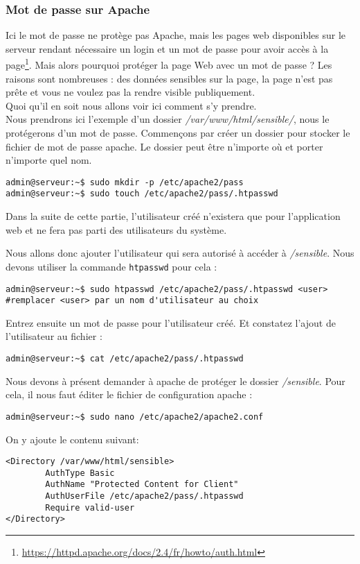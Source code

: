 \subsubsection{Mot de passe sur Apache}\label{MDP}
Ici le mot de passe ne protège pas Apache, mais les pages web disponibles sur le serveur rendant nécessaire un login et un mot de passe pour avoir accès à la page\footnote{\url{https://httpd.apache.org/docs/2.4/fr/howto/auth.html}}. Mais alors pourquoi protéger la page Web avec un mot de passe ? Les raisons sont nombreuses : des données sensibles sur la page, la page n'est pas prête et vous ne voulez pas la rendre visible publiquement. \\
Quoi qu'il en soit nous allons voir ici comment s'y prendre. \\
Nous prendrons ici l'exemple d'un dossier \emph{/var/www/html/sensible/}, nous le protégerons d'un mot de passe. 
Commençons par créer un dossier pour stocker le fichier de mot de passe apache. Le dossier peut être n'importe où et porter n'importe quel nom.
\begin{verbatim}
admin@serveur:~$ sudo mkdir -p /etc/apache2/pass
admin@serveur:~$ sudo touch /etc/apache2/pass/.htpasswd
\end{verbatim}

Dans la suite de cette partie, l'utilisateur créé n'existera que pour l'application web et ne fera pas parti des utilisateurs du système.

Nous allons donc ajouter l'utilisateur qui sera autorisé à accéder à \emph{/sensible}. Nous devons utiliser la commande \texttt{htpasswd} pour cela :
\begin{verbatim}
admin@serveur:~$ sudo htpasswd /etc/apache2/pass/.htpasswd <user> #remplacer <user> par un nom d'utilisateur au choix
\end{verbatim}
Entrez ensuite un mot de passe pour l'utilisateur créé. Et constatez l'ajout de l'utilisateur au fichier : 
\begin{verbatim}
admin@serveur:~$ cat /etc/apache2/pass/.htpasswd 
\end{verbatim}
 Nous devons à présent demander à apache de protéger le dossier 
\emph{/sensible}. Pour cela, il nous faut éditer le fichier de configuration apache : 
\begin{verbatim}
admin@serveur:~$ sudo nano /etc/apache2/apache2.conf
\end{verbatim}

On y ajoute le contenu suivant:
\begin{verbatim}
<Directory /var/www/html/sensible>
        AuthType Basic
        AuthName "Protected Content for Client"
        AuthUserFile /etc/apache2/pass/.htpasswd
        Require valid-user
</Directory>
\end{verbatim}

